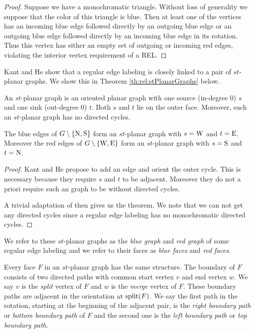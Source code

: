   \begin{proof}
    Suppose we have a monochromatic triangle. Without loss of generality we suppose that the color of this triangle is blue. Then at least one of the vertices has an incoming blue edge followed directly by an outgoing blue edge or an outgoing blue edge followed directly by an incoming blue edge in its rotation. Thus this vertex has either an empty set of outgoing or incoming red edges, violating the interior vertex requirement of a REL.
  \end{proof}

    Kant and He \cite[pp.179]{Kant1997} show that a regular edge labeling is closely linked to a pair of $st$-planar graphs. We show this in Theorem \ref{th:rel:stPlanarGraphs} below.

    An $st$-planar graph is an oriented planar graph with one source (in-degree 0) $s$ and one sink (out-degree 0) $t$. Both $s$ and $t$ lie on the outer face. Moreover, such an $st$-planar graph has no directed cycles.

    \begin{thrm}
      \label{th:rel:stPlanarGraphs}
      The blue edges of $G\setminus \left\lbrace {\mathrm{N},\mathrm{S}} \right\rbrace$ form an $st$-planar graph with $s= \mathrm{W}$ and $t=\mathrm{E}$. Moreover the red edges of $G\setminus \left\lbrace {\mathrm{W},\mathrm{E}} \right\rbrace$ form an $st$-planar graph with $s= \mathrm{S}$ and $t= \mathrm{N}$.
    \end{thrm}
    \begin{proof}
      Kant and He propose to add an edge and orient the outer cycle. This is necessary because they require $s$ and $t$ to be adjacent. Moreover they do not a priori require such an graph to be without directed cycles.

      A trivial adaptation of \cite[pp.179]{Kant1997} then gives us the theorem. We note that we can not get any directed cycles since a regular edge labeling has no monochromatic directed cycles.
    \end{proof}


    We refer to these $st$-planar graphs as the \emph{blue graph} and \emph{red graph} of some regular edge labeling and we refer to their faces as \emph{blue faces} and \emph{red faces}.

    Every face $F$ in an $st$-planar graph has the same structure. The boundary of $F$ consists of two directed paths with common start vertex $v$ and end vertex $w$. We say $v$ is the \emph{split} vertex of $F$ and $w$ is the \emph{merge} vertex of $F$.
    These boundary paths are adjacent in the orientation at $\operatorname{split}(F)$. We say the first path in the rotation, starting at the beginning of the adjacent pair, is the \emph{right boundary path} or \emph{bottom boundary path} of $F$ and the second one is the \emph{left boundary path} or \emph{top boundary path}.

